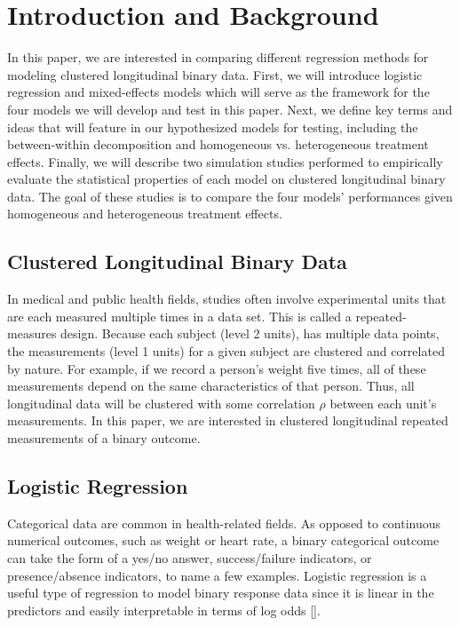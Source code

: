 \documentclass{article}
\begin{document}
\tableofcontents
\begin{appendices}
\end{appendices}

\newpage

\section{Introduction and Background}
    In this paper, we are interested in comparing different regression methods for modeling clustered longitudinal binary data. First, we will introduce logistic regression and mixed-effects models which will serve as the framework for the four models we will develop and test in this paper. Next, we define key terms and ideas that will feature in our hypothesized models for testing, including the between-within decomposition and homogeneous vs. heterogeneous treatment effects. Finally, we will describe two simulation studies performed to empirically evaluate the statistical properties of each model on clustered longitudinal binary data. The goal of these studies is to compare the four models' performances given homogeneous and heterogeneous treatment effects. 

    \subsection{Clustered Longitudinal Binary Data}
    In medical and public health fields, studies often involve experimental units that are each measured multiple times in a data set. This is called a repeated-measures design. Because each subject (level 2 units), has multiple data points, the measurements (level 1 units) for a given subject are clustered and correlated by nature. For example, if we record a person's weight five times, all of these measurements depend on the same characteristics of that person. Thus, all longitudinal data will be clustered with some correlation $\rho$ between each unit's measurements. In this paper, we are interested in clustered longitudinal repeated measurements of a binary outcome.

    \subsection{Logistic Regression}
    Categorical data are common in health-related fields. As opposed to continuous numerical outcomes, such as weight or heart rate, a binary categorical outcome can take the form of a yes/no answer, success/failure indicators, or presence/absence indicators, to name a few examples. Logistic regression is a useful type of regression to model binary response data since it is linear in the predictors and easily interpretable in terms of log odds [\citealt{agresti2015foundations}].
    
\end{document}

